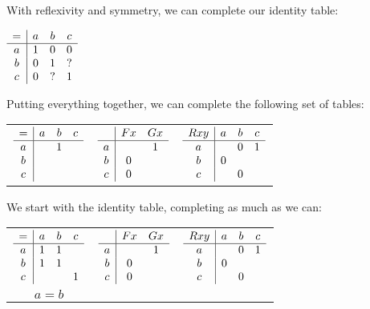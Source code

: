 \documentclass[PHIL101-Textbook.tex]{subfiles}
\begin{document}
With reflexivity and symmetry, we can complete our identity table:

\begin{center}
  $\begin{array}{c|ccc}
	   = & a  & b & c\\ \hline
	   a & 1 & 0 & 0 \\
	   b & 0 & 1 & ?\\
	   c & 0 & ? & 1
	\end{array}$
 \end{center}

\noindent Putting everything together, we can complete the following set of tables:

\begin{center}
  \begin{tabular}{ccc}
   $\begin{array}{c|ccc}
	   = & a & b & c\\ \hline
	   a & & 1 &\\
	   b & & &\\
	   c & & &
	\end{array}$
	 &
   $\begin{array}{c|cc}
	    & \mathord{F}{x}& \mathord{G}{x}\\ \hline
	  a & & 1 \\
	  b & 0 & \\
	  c & 0 &
	\end{array}$
	 &
   $\begin{array}{c|ccc}
	  \mathord{R}{xy} & a & b & c\\ \hline
	  a & & 0 & 1 \\
	  b & 0 & & \\
	  c & & 0 & 
	\end{array}$
  \end{tabular}
\end{center}

\noindent We start with the identity table, completing as much as we can: 

\begin{center}
  \begin{tabular}{ccc}
   $\begin{array}{c|ccc}
	   = & a & b & c\\ \hline
	   a & 1 & 1 &\\
	   b & 1 & 1 &\\
	   c & & & 1
	\end{array}$
	 &
   $\begin{array}{c|cc}
	  & \mathord{F}{x} & \mathord{G}{x}\\ \hline
	  a & & 1 \\
	  b & 0 & \\
	  c & 0 &
	\end{array}$
	 &
   $\begin{array}{c|ccc}
	  \mathord{R}{xy} & a & b & c\\ \hline
	  a & & 0 & 1 \\
	  b & 0 & & \\
	  c & & 0 & 
	\end{array}$\\
	$a=b$
  \end{tabular}
\end{center}
\end{document}

